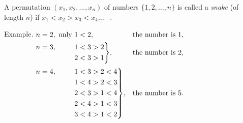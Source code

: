 \documentclass[12pt]{article}  %
\begin{document}
\newpage
{} A permutation $(x_1,x_2, \dots,x_n)$ of numbers $\{1, 2, \dots, n\}$ is called a 
    \emph{snake} (of length $n$) if $x_1<x_2>x_3<x_4 \dots$ \  .
    \medskip

{\sc Example.}
$\begin{aligned}[t]
&\begin{aligned}[t] n=2, \text{ only }  1<2, \end{aligned} &&\text{the number is  }1, \\
&\hskip-\nulldelimiterspace\mathord{\left.\begin{aligned} n=3, \hphantom{\text{ only }} 1&<3>2 \\ 
                                              2&<3>1\end{aligned} \right\}}, && \text{the number is  }2,  \\[2pt]
&\hskip-\nulldelimiterspace\mathord{\left.\begin{aligned} n=4, \hphantom{\text{ only }} 1&<3>2<4 \\ 
                                              1&<4>2<3 \\ 
                                    2&<3>1<4 \\ 
                                    2&<4>1<3 \\ 
                                    3&<4>1<2\end{aligned} \right\}},
                                    &&\text{the number is  }5. \\
\end{aligned}$

\end{document}
